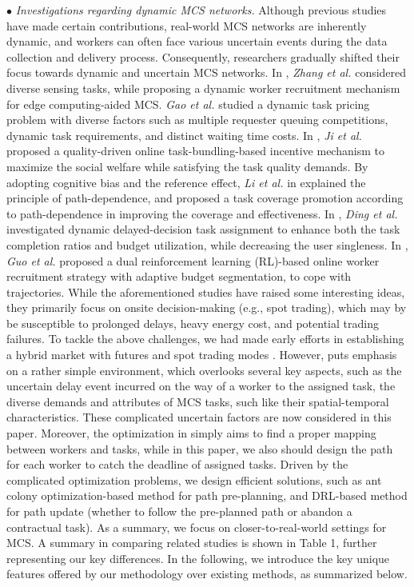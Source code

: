 \noindent
$\bullet$ \textit{Investigations regarding dynamic MCS networks.} Although previous studies have made certain contributions, real-world MCS networks are inherently dynamic, and workers can often face various uncertain events during the data collection and delivery process. Consequently, researchers gradually shifted their focus towards dynamic and uncertain MCS networks\cite{SURVEY 2,RWork_dynamic 1,RWork_dynamic 2,RWork_dynamic 3,RWork_dynamic 4,RWork_dynamic 5}. 
In \cite{SURVEY 2}, \textit{Zhang et al.} considered diverse sensing tasks, while proposing a dynamic worker recruitment mechanism for edge computing-aided MCS. 
\textit{Gao et al.} \cite{RWork_dynamic 1} studied a dynamic task pricing problem with diverse factors such as multiple requester queuing competitions, dynamic task requirements, and distinct waiting time costs.
In \cite{RWork_dynamic 2}, \textit{Ji et al.} proposed a quality-driven online task-bundling-based incentive mechanism to maximize the social welfare while satisfying the task quality demands.
By adopting cognitive bias and the reference effect, \textit{Li et al.} in \cite{RWork_dynamic 3} explained the principle of path-dependence, and proposed a task coverage promotion according to path-dependence in improving the coverage and effectiveness.
In \cite{RWork_dynamic 4}, \textit{Ding et al.} investigated dynamic delayed-decision task assignment to enhance both the task completion ratios and budget utilization, while decreasing the user singleness.
In \cite{RWork_dynamic 5}, \textit{Guo et al.} proposed a dual reinforcement learning (RL)-based online worker recruitment strategy with adaptive budget segmentation, to cope with trajectories.
While the aforementioned studies have raised some interesting ideas, they primarily focus on onsite decision-making (e.g., spot trading), which may by be susceptible to prolonged delays, heavy energy cost, and potential trading failures. To tackle the above challenges, we had made early efforts in establishing a hybrid market with futures and spot trading modes \cite{DP2}. However, \cite{DP2} puts emphasis on a rather simple environment, which overlooks several key aspects, such as the uncertain delay event incurred on the way of a worker to the assigned task, the diverse demands and attributes of MCS tasks, such like their spatial-temporal characteristics. These complicated uncertain factors are now considered in this paper.
Moreover, the optimization in \cite{DP2} simply aims to find a proper mapping between workers and tasks, while in this paper, we also should design the path for each worker to catch the deadline of assigned tasks. Driven by the complicated optimization problems, we design efficient solutions, such as ant colony optimization-based method for path pre-planning, and DRL-based method for path update (whether to follow the pre-planned path or abandon a contractual task). As a summary, we focus on closer-to-real-world settings for MCS. A summary in comparing related studies is shown in Table 1, further representing our key differences. In the following, we introduce the key unique features offered by our methodology over existing methods, as summarized below.
 
